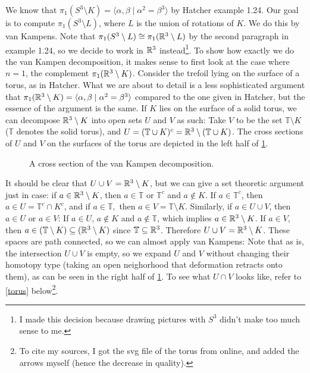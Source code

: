 \begin{solution}
    We know that $\pi_1(S^3\setminus K)=\langle \alpha ,\beta  \mid \alpha ^2=\beta ^3 \rangle     $ by Hatcher example 1.24. Our goal is to compute $\pi_1(S^3\setminus L)$, where $L$ is the union of rotations of $K$. We do this by van Kampens. Note that $\pi_1(S^3\setminus L)\cong \pi_1(\mathbb{R}^3\setminus L)$ by the second paragraph in example 1.24, so we decide to work in $\mathbb{R}^3 $ instead\footnote{I made this decision because drawing pictures with $S^3$ didn't make too much sense to me.}. To show how exactly we do the van Kampen decomposition, it makes sense to first look at the case where $n=1$, the complement $\pi_1(\mathbb{R}^3 \setminus K)$. Consider the trefoil lying on the surface of a torus, as in Hatcher. What we are about to detail is a less sophisticated argument that $\pi_1(\mathbb{R}^3\setminus K)=\langle \alpha ,\beta  \mid \alpha ^2=\beta ^3 \rangle $ compared to the one given in Hatcher, but the essence of the argument is the same. If $K$ lies on the surface of a solid torus, we can decompose $\mathbb{R}^3\setminus K$ into open sets $U$ and $V$ as such: Take $V$ to be the set $\mathbb{T}\setminus K$ ($\mathbb{T}$ denotes the solid torus), and $U=(\mathbb{T}\cup K)^{c}=\mathbb{R}^3 \setminus (\mathbb{T}\cup K)$. The cross sections of $U$ and $V$ on the surfaces of the torus are depicted in the left half of \cref{comp}.     
    \begin{figure}[H]
    \centering
    \caption{A cross section of the van Kampen decomposition.}
    \label{comp}
    \end{figure}
    It should be clear that $U \cup V=\mathbb{R}^3\setminus K$, but we can give a set theoretic argument just in case: if $a\in \mathbb{R}^3\setminus K$, then $a\in \mathbb{T}$ or $\mathbb{T}^{c}$ and $a\notin K$. If $a\in \mathbb{T}^{c}$, then $a\in U=\mathbb{T}^{c}\cap K^{c}$, and if $a\in \mathbb{T},$ then $a\in V=\mathbb{T}\setminus K$. Similarly, if $a\in U \cup V$, then $a\in U$ or $a\in V$: If $a\in U$, $a\notin K$ and $a\notin \mathbb{T}$, which implies $a\in \mathbb{R}^3 \setminus K$. If $a\in V$, then $a\in (\mathbb{T}\setminus K) \subseteq (\mathbb{R}^3\setminus K)$ since $\mathbb{T}\subseteq \mathbb{R}^3$. Therefore $U \cup V=\mathbb{R}^3\setminus K$. These spaces are path connected, so we can almost apply van Kampens: Note that as is, the intersection $U \cup V$ is empty, so we expand $U$ and $V$ without changing their homotopy type (taking an open neighorhood that deformation retracts onto them), as can be seen in the right half of \cref{comp}. 
    To see what $U \cap V$ looks like, refer to \cref{torus} below\footnote{To cite my sources, I got the svg file of the torus from online, and added the arrows myself (hence the decrease in quality).}.

\end{solution}
